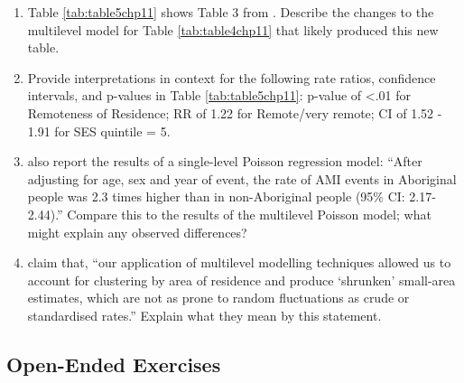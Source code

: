\documentclass[
]{krantz}
\begin{document}
\begin{enumerate}
\def\labelenumi{\arabic{enumi}.}
\setcounter{enumi}{24}
\item
  Table \ref{tab:table5chp11} shows Table 3 from \citet{Randall2014}. Describe the changes to the multilevel model for Table \ref{tab:table4chp11} that likely produced this new table.
\item
  Provide interpretations in context for the following rate ratios, confidence intervals, and p-values in Table \ref{tab:table5chp11}: p-value of \textless.01 for Remoteness of Residence; RR of 1.22 for Remote/very remote; CI of 1.52 - 1.91 for SES quintile = 5.
\item
  \citet{Randall2014} also report the results of a single-level Poisson regression model: ``After adjusting for age, sex and year of event, the rate of AMI events in Aboriginal people was 2.3 times higher than in non-Aboriginal people (95\% CI: 2.17-2.44).'' Compare this to the results of the multilevel Poisson model; what might explain any observed differences?
\item
  \citet{Randall2014} claim that, ``our application of multilevel modelling techniques allowed us to account for clustering by area of residence and produce `shrunken' small-area estimates, which are not as prone to random fluctuations as crude or standardised rates.'' Explain what they mean by this statement.
\end{enumerate}

\hypertarget{open-ended-exercises-7}{%
\subsection{Open-Ended Exercises}\label{open-ended-exercises-7}}
\end{document}
